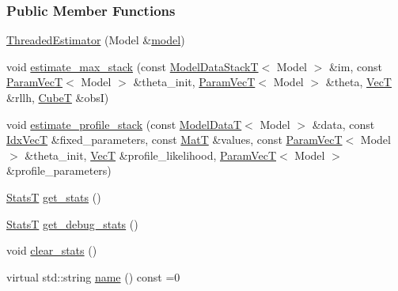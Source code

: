 \subsubsection*{Public Member Functions}
\begin{DoxyCompactItemize}
\item 
\hyperlink{classmappel_1_1ThreadedEstimator_a38c404495524da7bc9ea8715e7f6a4f6}{Threaded\+Estimator} (Model \&\hyperlink{classmappel_1_1Estimator_a8322546d87ccdf01f8b0dcd9dae509f0}{model})
\item 
void \hyperlink{classmappel_1_1ThreadedEstimator_afb7a2e27b4e8dcc2fa604f83344461fe}{estimate\+\_\+max\+\_\+stack} (const \hyperlink{namespacemappel_aaeb6665bc57476dd93c2df6ad8bc4768}{Model\+Data\+StackT}$<$ Model $>$ \&im, const \hyperlink{namespacemappel_a0f86d3153e4e27b095012f140eea58de}{Param\+VecT}$<$ Model $>$ \&theta\+\_\+init, \hyperlink{namespacemappel_a0f86d3153e4e27b095012f140eea58de}{Param\+VecT}$<$ Model $>$ \&theta, \hyperlink{namespacemappel_a2225ad69f358daa3f4f99282a35b9a3a}{VecT} \&rllh, \hyperlink{namespacemappel_ab2afab4e6c8805e83946670d882768c2}{CubeT} \&obsI)
\item 
void \hyperlink{classmappel_1_1ThreadedEstimator_aebbf686f95be1331ff85cecd5a3c97db}{estimate\+\_\+profile\+\_\+stack} (const \hyperlink{namespacemappel_a97f050df953605381ae9c901c3b125f1}{Model\+DataT}$<$ Model $>$ \&data, const \hyperlink{namespacemappel_ac63743dcd42180127307cd0e4ecdd784}{Idx\+VecT} \&fixed\+\_\+parameters, const \hyperlink{namespacemappel_a7091ab87c528041f7e2027195fad8915}{MatT} \&values, const \hyperlink{namespacemappel_a0f86d3153e4e27b095012f140eea58de}{Param\+VecT}$<$ Model $>$ \&theta\+\_\+init, \hyperlink{namespacemappel_a2225ad69f358daa3f4f99282a35b9a3a}{VecT} \&profile\+\_\+likelihood, \hyperlink{namespacemappel_a0f86d3153e4e27b095012f140eea58de}{Param\+VecT}$<$ Model $>$ \&profile\+\_\+parameters)
\item 
\hyperlink{namespacemappel_a04ab395b0cf82c4ce68a36b2212649a5}{StatsT} \hyperlink{classmappel_1_1ThreadedEstimator_ab216e13ec19785839bc73caf7fac1c91}{get\+\_\+stats} ()
\item 
\hyperlink{namespacemappel_a04ab395b0cf82c4ce68a36b2212649a5}{StatsT} \hyperlink{classmappel_1_1ThreadedEstimator_ab281b131d160352ee949dd33d49cf55e}{get\+\_\+debug\+\_\+stats} ()
\item 
void \hyperlink{classmappel_1_1ThreadedEstimator_a8acce3a5a89128403c97b53bc3698d61}{clear\+\_\+stats} ()
\item 
virtual std\+::string \hyperlink{classmappel_1_1Estimator_a403f11575f81e47095e57cc403fd760d}{name} () const =0

\end{DoxyCompactItemize}
